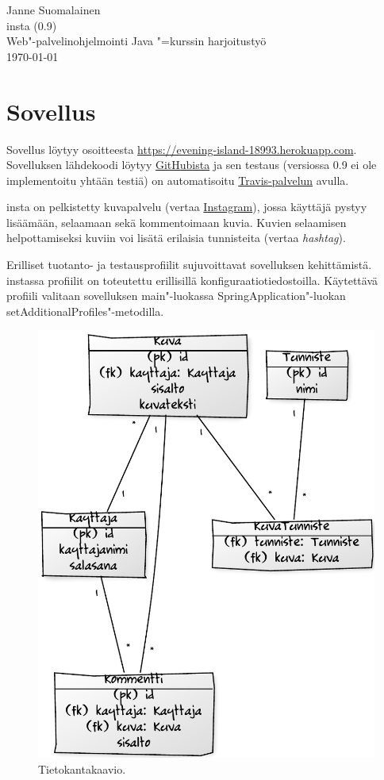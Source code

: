 \documentclass[finnish,colorlinks,headings=normal,parskip=half,footsepline]{scrartcl}
\begin{document}
Janne Suomalainen\\\textsf{insta} (0.9)\\Web"-palvelinohjelmointi Java "=kurssin harjoitustyö\\\today

\section{Sovellus}
Sovellus löytyy osoitteesta \url{https://evening-island-18993.herokuapp.com}. Sovelluksen lähdekoodi löytyy \href{https://github.com/suomja1/insta}{GitHubista} ja sen testaus (versiossa 0.9 ei ole implementoitu yhtään testiä) on automatisoitu \href{https://travis-ci.org/suomja1/insta}{Travis-palvelun} avulla.

\textsf{insta} on pelkistetty kuvapalvelu (vertaa \href{https://www.instagram.com}{Instagram}), jossa käyttäjä pystyy lisäämään, selaamaan sekä kommentoimaan kuvia. Kuvien selaamisen helpottamiseksi kuviin voi lisätä erilaisia tunnisteita (vertaa \emph{hashtag}).

Erilliset tuotanto- ja testausprofiilit sujuvoittavat sovelluksen kehittämistä. \textsf{insta}ssa profiilit on toteutettu erillisillä konfiguraatiotiedostoilla. Käytettävä profiili valitaan sovelluksen main"-luokassa SpringApplication"-luokan setAdditionalProfiles"-metodilla.

\begin{figure}
\vspace*{-\intextsep}
\centering\includegraphics[width=\linewidth]{6424b8c7}
\caption{Tietokantakaavio.}\label{fig:tk}
\end{figure}
\end{document}
